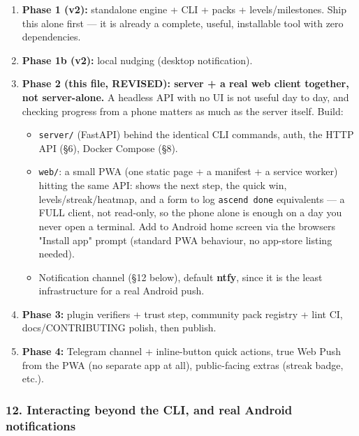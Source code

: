 \begin{enumerate}
\def\labelenumi{\arabic{enumi}.}
\tightlist
\item
  \textbf{Phase 1 (v2):} standalone engine + CLI + packs +
  levels/milestones. Ship this alone first --- it is already a complete,
  useful, installable tool with zero dependencies.
\item
  \textbf{Phase 1b (v2):} local nudging (desktop notification).
\item
  \textbf{Phase 2 (this file, REVISED): server + a real web client
  together, not server-alone.} A headless API with no UI is not useful
  day to day, and checking progress from a phone matters as much as the
  server itself. Build:

  \begin{itemize}
  \tightlist
  \item
    \texttt{server/} (FastAPI) behind the identical CLI commands, auth,
    the HTTP API (§6), Docker Compose (§8).
  \item
    \texttt{web/}: a small PWA (one static page + a manifest + a service
    worker) hitting the same API: shows the next step, the quick win,
    levels/streak/heatmap, and a form to log \texttt{ascend done}
    equivalents --- a FULL client, not read-only, so the phone alone is
    enough on a day you never open a terminal. Add to Android home
    screen via the browser\textquotesingle s "Install app" prompt
    (standard PWA behaviour, no app-store listing needed).
  \item
    Notification channel (§12 below), default \textbf{ntfy}, since it is
    the least infrastructure for a real Android push.
  \end{itemize}
\item
  \textbf{Phase 3:} plugin verifiers + trust step, community pack
  registry + lint CI, docs/CONTRIBUTING polish, then publish.
\item
  \textbf{Phase 4:} Telegram channel + inline-button quick actions, true
  Web Push from the PWA (no separate app at all), public-facing extras
  (streak badge, etc.).
\end{enumerate}

\hypertarget{spec-v3-public-release-12-interacting-beyond-the-cli-and-real-android-notifications}{%
\subsubsection{12. Interacting beyond the CLI, and real Android
notifications}\label{spec-v3-public-release-12-interacting-beyond-the-cli-and-real-android-notifications}}

